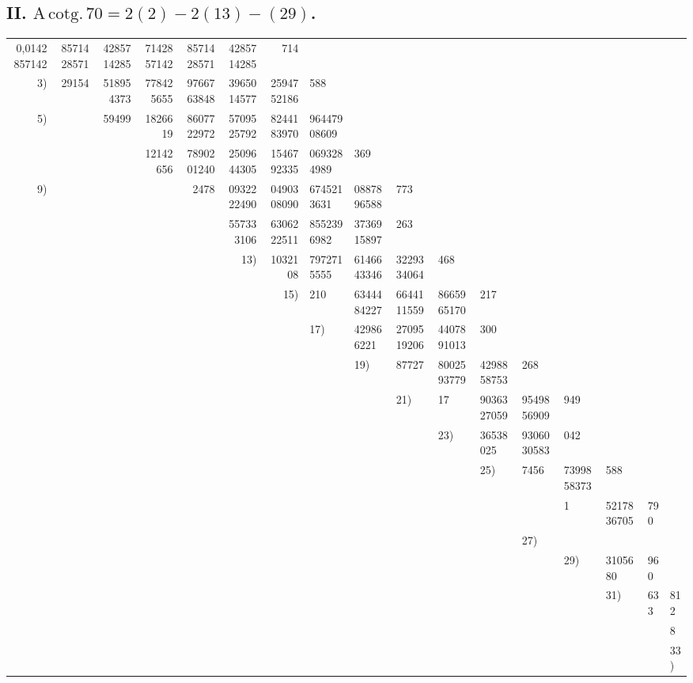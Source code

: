 \documentclass[10pt,a4paper]{article}
\begin{document}
\subsection*{II. $\mathrm{A\,cotg.}\,70 = 2(2) - 2(13) - (29)$.}

\begin{center}
\begin{tabular}{r r r r r r r}
0,0142857142 & 8571428571 & 4285714285 & 7142857142 & 8571428571 & 4285714285 & 714 \\
3) & 29154 & 518954373 & 778425655 & 9766763848 & 3965014577 & 2594752186 & 588 \\
5) & & 59499 & 1826619 & 8607722972 & 5709525792 & 8244183970 & 96447908609 \\
& & & 12142656 & 7890201240 & 2509644305 & 1546792335 & 0693284989 & 369 \\
9) & & & & 2478 & 0932222490 & 0490308090 & 6745213631 & 0887896588 & 773 \\
& & & & & 557333106 & 6306222511 & 8552396982 & 3736915897 & 263 \\
& & & & & 13) & 1032108 & 7972715555 & 6146643346 & 3229334064 & 468 \\
& & & & & & 15) & 210 & 6344484227 & 6644111559 & 8665965170 & 217 \\
& & & & & & & 17) & 429866221 & 2709519206 & 4407891013 & 300 \\
& & & & & & & & 19) & 87727 & 8002593779 & 4298858753 & 268 \\
& & & & & & & & & 21) & 17 & 9036327059 & 9549856909 & 949 \\
& & & & & & & & & & 23) & 36538025 & 9306030583 & 042 \\
& & & & & & & & & & & 25) & 7456 & 7399858373 & 588 \\
& & & & & & & & & & & & & 1 & 5217836705 & 790 \\
& & & & & & & & & & & & 27) & & & \\
& & & & & & & & & & & & & 29) & 3105680 & 960 \\
& & & & & & & & & & & & & & 31) & 633 & 812 \\
& & & & & & & & & & & & & & & & 8 \\
& & & & & & & & & & & & & & & & 33) \\
\end{tabular}
\end{center}

\medskip
\end{document}
